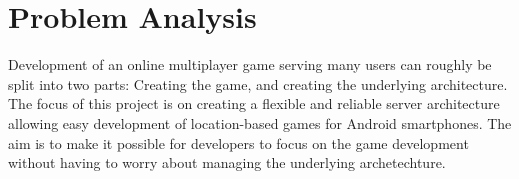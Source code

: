 \chapter{Problem Analysis}


Development of an online multiplayer game serving many users can roughly be split into two parts: Creating the game, and creating the underlying architecture. The focus of this project is on creating a flexible and reliable server architecture  allowing easy development of location-based games for Android smartphones. The aim is to make it possible for developers to focus on the game development without having to worry about managing the underlying archetechture. 






